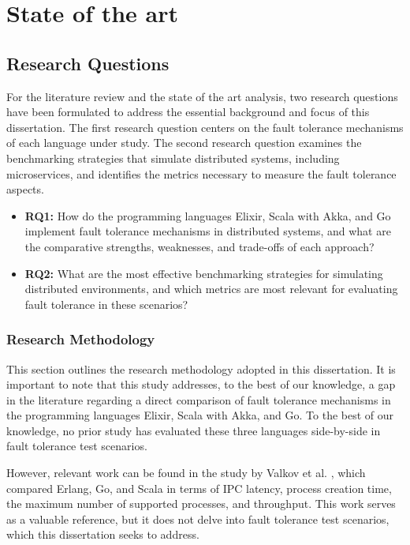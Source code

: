 \chapter{State of the art} %

%
\section{Research Questions}

For the literature review and the state of the art analysis, two research questions have been formulated to address the essential background and focus of this dissertation. The first research question centers on the fault tolerance mechanisms of each language under study. The second research question examines the benchmarking strategies that simulate distributed systems, including microservices, and identifies the metrics necessary to measure the fault tolerance aspects.

\begin{itemize}
    \item \textbf{RQ1:} How do the programming languages Elixir, Scala with Akka, and Go implement fault tolerance mechanisms in distributed systems, and what are the comparative strengths, weaknesses, and trade-offs of each approach?
    \item \textbf{RQ2:} What are the most effective benchmarking strategies for simulating distributed environments, and which metrics are most relevant for evaluating fault tolerance in these scenarios?
\end{itemize}

\subsection{Research Methodology}

This section outlines the research methodology adopted in this dissertation. It is important to note that this study addresses, to the best of our knowledge, a gap in the literature regarding a direct comparison of fault tolerance mechanisms in the programming languages Elixir, Scala with Akka, and Go. To the best of our knowledge, no prior study has evaluated these three languages side-by-side in fault tolerance test scenarios.

However, relevant work can be found in the study by Valkov et al. \cite{Valkov2018}, which compared Erlang, Go, and Scala in terms of \gls{IPC} latency, process creation time, the maximum number of supported processes, and throughput. This work serves as a valuable reference, but it does not delve into fault tolerance test scenarios, which this dissertation seeks to address.


